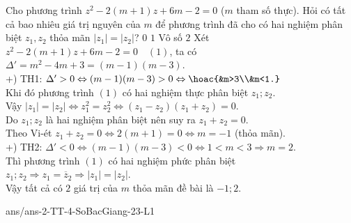\begin{ex}%
Cho phương trình $z^2-2(m+1)z+6m-2= 0$ ($m$ tham số thực). Hỏi
có tất cả bao nhiêu giá trị nguyên của $m$ để phương trình đã cho có hai nghiệm phân biệt $z_1, z_2$ thỏa mãn $|z_1|=|z_2|$?
\choice
{$0$}
{$1$}
{Vô số}
{\True $2$}
\loigiai
{Xét $z^2-2(m+1)z+6m-2= 0\quad (1)$, ta có $\Delta' = m^2 -4m +3=(m - 1)(m - 3)$.\\
+) TH1: $\Delta' > 0 \Leftrightarrow (m - 1)(m - 3) > 0\Leftrightarrow \hoac{&m>3\\&m<1.}$\\
Khi đó phương trình $(1)$ có hai nghiệm thực phân biệt $z_1; z_2$.\\
Vậy $|z_1|=|z_2| \Leftrightarrow z_1^2=z_2^2 \Leftrightarrow (z_1 - z_2)(z_1 +z_2) = 0$.\\
Do $z_1 ; z_2$ là hai nghiệm phân biệt nên suy ra $z_1+ z_2 =0$.\\
Theo Vi-ét $z_1 + z_2 = 0 \Leftrightarrow 2(m + 1) = 0 \Leftrightarrow m =-1$ (thỏa mãn).\\
+) TH2: $\Delta' < 0 \Leftrightarrow (m - 1)(m - 3) < 0\Leftrightarrow 1 < m < 3\Rightarrow m = 2.$\\
Thì phương trình $(1)$ có hai nghiệm phức phân biệt $z_1 ; z_2\Rightarrow z_1=\overline{z}_2\Rightarrow |z_1| = |z_2|$.\\
Vậy tất cả có $2$ giá trị của $m$ thỏa mãn đề bài là $-1; 2$.
}
\end{ex}

\begin{indapan}{10}
{ans/ans-2-TT-4-SoBacGiang-23-L1}
\end{indapan}